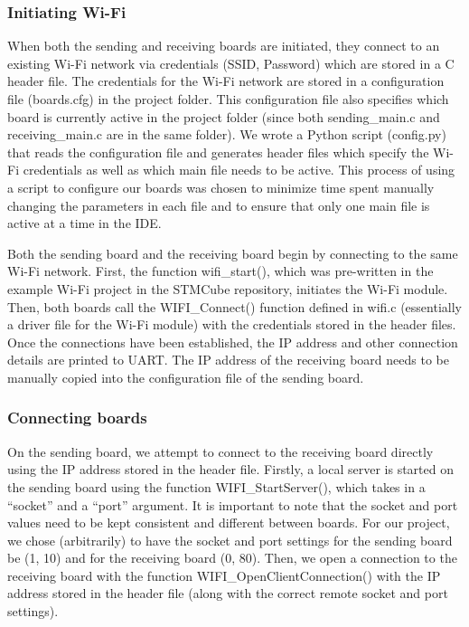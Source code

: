 \documentclass[journal]{IEEEtran}
\begin{document}
\vspace{10pt}
\subsubsection{Initiating Wi-Fi}

When both the sending and receiving boards are initiated, they connect to an existing Wi-Fi network via credentials (SSID, Password) which are stored in a C header file. The credentials for the Wi-Fi network are stored in a configuration file (boards.cfg) in the project folder. This configuration file also specifies which board is currently active in the project folder (since both sending\_main.c and receiving\_main.c are in the same folder). We wrote a Python script (config.py) that reads the configuration file and generates header files which specify the Wi-Fi credentials as well as which main file needs to be active. This process of using a script to configure our boards was chosen to minimize time spent manually changing the parameters in each file and to ensure that only one main file is active at a time in the IDE.

Both the sending board and the receiving board begin by connecting to the same Wi-Fi network. First, the function wifi\_start(), which was pre-written in the example Wi-Fi project in the STMCube repository, initiates the Wi-Fi module. Then, both boards call the WIFI\_Connect() function defined in wifi.c (essentially a driver file for the Wi-Fi module) with the credentials stored in the header files. Once the connections have been established, the IP address and other connection details are printed to UART. The IP address of the receiving board needs to be manually copied into the configuration file of the sending board.

\vspace{10pt}
\subsubsection{Connecting boards}
On the sending board, we attempt to connect to the receiving board directly using the IP address stored in the header file. Firstly, a local server is started on the sending board using the function WIFI\_StartServer(), which takes in a “socket” and a “port” argument. It is important to note that the socket and port values need to be kept consistent and different between boards. For our project, we chose (arbitrarily) to have the socket and port settings for the sending board be (1, 10) and for the receiving board (0, 80). Then, we open a connection to the receiving board with the function WIFI\_OpenClientConnection() with the IP address stored in the header file (along with the correct remote socket and port settings). 
\end{document}
